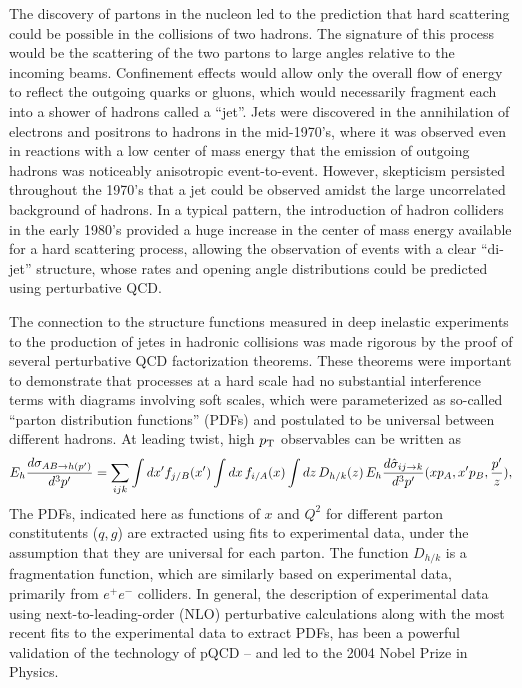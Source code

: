The discovery of partons in the nucleon led to the prediction that hard scattering could
be possible in the collisions of two hadrons.  The signature of this process would be 
the scattering of the two partons to large angles relative to the incoming beams. 
Confinement effects would allow only the overall flow of energy to reflect the outgoing
quarks or gluons, which would necessarily fragment each into a shower of hadrons called
a ``jet''.  Jets were discovered in the annihilation of electrons and positrons to
hadrons in the mid-1970's, where it was observed even in reactions with a low center
of mass energy that the emission of outgoing hadrons was noticeably anisotropic event-to-event.
However, skepticism persisted throughout the 1970's that a jet could be observed amidst the large
uncorrelated background of hadrons.
In a typical pattern, the introduction of hadron colliders in the early 1980's provided a
huge increase in the center of mass energy available for a hard scattering process,
allowing the observation of events with a clear ``di-jet'' structure, whose rates and
opening angle distributions could be predicted using perturbative QCD.

The connection to the structure functions measured in deep inelastic experiments to 
the production of jetes in hadronic collisions was made rigorous by the proof of several
perturbative QCD factorization theorems.
These theorems were important to demonstrate that processes at a hard scale had no
substantial interference terms with diagrams involving soft scales, which were 
parameterized as so-called ``parton distribution functions'' (PDFs) and postulated to be
universal between different hadrons.
At leading twist, high $\mbox{$p_{\mathrm{T}}$}$ observables can be written as
\begin{equation}
E_h {d{\sigma}_{AB\rightarrow h(p')}\over d^3p'}
=
\sum_{ijk}\int dx' f_{j/B}(x')
          \int dx\, f_{i/A}(x)
          \int dz\, D_{h/k}(z)\,
          E_h {d\hat{\sigma}_{ij\rightarrow k}\over d^3p'} 
          (xp_A,x'p_B,\frac{p'}{z}) ,
\label{twist2conv}
\end{equation}
The PDFs, indicated here as functions of $x$ and $Q^2$ for different parton constitutents ($q,g$)
are extracted using fits to experimental data, under the assumption that they are universal
for each parton.  The function $D_{h/k}$ is a fragmentation function, which are similarly based
on experimental data, primarily from $e^+ e^-$ colliders.
In general, the description of experimental data using next-to-leading-order (NLO) perturbative calculations
along with the most recent fits to the experimental data to extract PDFs, has been a powerful validation
of the technology of pQCD -- and led to the 2004 Nobel Prize in Physics.

